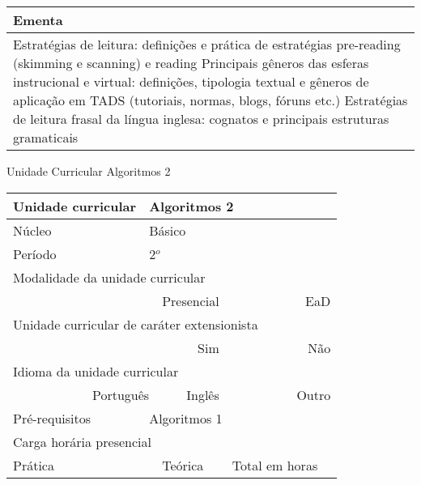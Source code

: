 \begin{quadro}[ht!]
\begin{tabular}{|p{3cm} p{2cm} p{3cm} p{2cm} p{3cm} p{2cm}|}
\multicolumn{6}{|p{15cm}|}{\cellcolor{blue1} Ementa} \\\hline
\hline\multicolumn{6}{|p{15cm}|}{\scriptsize Estratégias de leitura: definições e prática de estratégias pre-reading (skimming e scanning) e reading Principais gêneros das esferas instrucional e virtual: definições, tipologia textual e gêneros de aplicação em TADS (tutoriais, normas, blogs, fóruns etc.) Estratégias de leitura frasal da língua inglesa: cognatos e principais estruturas gramaticais}\\\hline
\hline
	\end{tabular}
\end{quadro}
\begin{quadro}[ht!]
  \centering\scriptsize
\caption{Unidade Curricular Algoritmos 2}
\label{ unit_6 }
\begin{tabular}{|p{3cm} p{2cm} p{3cm} p{2cm} p{3cm} p{2cm}|}\hline
\multicolumn{1}{|p{3cm}|}{\cellcolor{blue1} Unidade curricular} & \multicolumn{5}{p{9cm}|}{ Algoritmos 2 }\\\hline
\multicolumn{1}{|p{3cm}|}{\cellcolor{blue1} Núcleo} & \multicolumn{5}{p{11.5cm}|}{ Básico }\\\hline
\multicolumn{1}{|p{3cm}|}{\cellcolor{blue1} Período} & \multicolumn{5}{p{9cm}|}{ 2$^o$ }\\\hline
\multicolumn{6}{|p{15cm}|}{\cellcolor{blue1} Modalidade da unidade curricular} \\\hline
\multicolumn{2}{|r}{		} &  \multicolumn{2}{r}{Presencial \XBox } & \multicolumn{2}{r|}{EaD \Square	} \\\hline
\multicolumn{6}{|p{15cm}|}{\cellcolor{blue1} Unidade curricular de caráter extensionista} \\\hline
\multicolumn{4}{|r}{			Sim \Square	} & \multicolumn{2}{r|}{	Não \XBox	}\\\hline
\multicolumn{6}{|p{15cm}|}{\cellcolor{blue1} Idioma da unidade curricular} \\ \hline
\multicolumn{2}{|r}{	Português \XBox	} &  \multicolumn{2}{r}{	Inglês \Square	} & \multicolumn{2}{r|}{	Outro \Square	} \\ \hline
\multicolumn{1}{|p{3cm}|}{\cellcolor{blue1} Pré-requisitos} & \multicolumn{5}{p{9cm}|}{ Algoritmos 1 }\\ \hline
\multicolumn{6}{|p{15cm}|}{\cellcolor{blue1} Carga horária presencial} \\ \hline
\multicolumn{1}{|p{3cm}|}{\raggedleft Prática} & \multicolumn{1}{p{1cm}|}{\centering	30	} &  \multicolumn{1}{p{3cm}|}{\raggedleft Teórica}  & \multicolumn{1}{p{1cm}|}{\centering 	30 } & \multicolumn{1}{p{3cm}|}{\raggedleft Total em horas} & \multicolumn{1}{p{1cm}|}{\raggedleft	60	} \\ \hline

\end{tabular}
\end{quadro}
